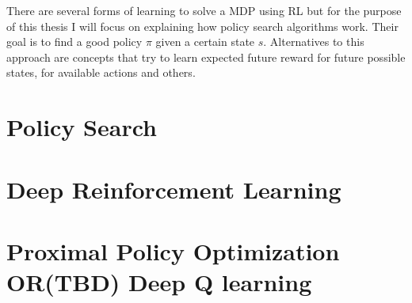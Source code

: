 There are several forms of learning to solve a \ac {MDP} using \ac {RL} but for the purpose of this thesis I will focus
on explaining how policy search algorithms work. Their goal is to find a good policy $\pi$ given a certain state $s$.
Alternatives to this approach are concepts that try to learn expected future reward for future possible states, for
available actions and others. %


\section{Policy Search} \section{Deep Reinforcement Learning}

\section{Proximal Policy Optimization OR(TBD) Deep Q learning}

